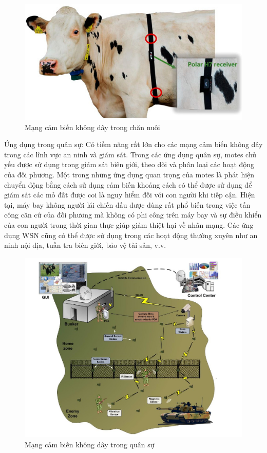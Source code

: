 \documentclass{report}
\begin{document}
\begin{figure}[h]
	\centering
	\includegraphics[scale = 0.5]{fig10.png}
	\caption{Mạng cảm biến không dây trong chăn nuôi}
	\label{fig:Graph10}
\end{figure}

Ứng dụng trong quân sự: Có tiềm năng rất lớn cho các mạng cảm biến không dây trong các lĩnh vực an ninh và giám sát. Trong các ứng dụng quân sự, motes chủ yếu được sử dụng trong giám sát biên giới, theo dõi và phân loại các hoạt động của đối phương. Một trong những ứng dụng quan trọng của motes là phát hiện chuyển động bằng cách sử dụng cảm biến khoảng cách có thể được sử dụng để giám sát các mỏ đất được coi là nguy hiểm đối với con người khi tiếp cận. Hiện tại, máy bay không người lái chiến đấu được dùng rất phổ biến trong việc tấn công căn cứ của đối phương mà không có phi công trên máy bay và sự điều khiển của con người trong thời gian thực giúp giảm thiệt hại về nhân mạng. Các ứng dụng WSN cũng có thể được sử dụng trong các hoạt động thường xuyên như an ninh nội địa, tuần tra biên giới, bảo vệ tài sản, v.v.
\newpage
\begin{figure}[h]
	\centering
	\includegraphics[scale = 0.5]{fig11.png}
	\caption{Mạng cảm biến không dây trong quân sự}
	\label{fig:Graph11}
\end{figure}
\end{document}
